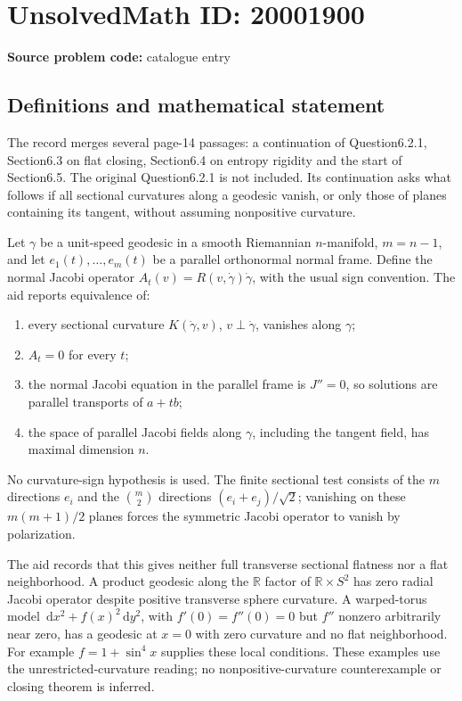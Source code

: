 \documentclass[11pt]{article}
\newcommand{\R}{\mathbb{R}}
\newcommand{\dd}{\,\mathrm{d}}
\begin{document}
\section*{UnsolvedMath ID: 20001900}
\textbf{Source problem code:} catalogue entry
\subsection{Definitions and mathematical statement}
The record merges several page-14 passages: a continuation of Question6.2.1, Section6.3 on flat closing, Section6.4 on entropy rigidity and the start of Section6.5. The original Question6.2.1 is not included. Its continuation asks what follows if all sectional curvatures along a geodesic vanish, or only those of planes containing its tangent, without assuming nonpositive curvature.

Let \(\gamma\) be a unit-speed geodesic in a smooth Riemannian \(n\)-manifold, \(m=n-1\), and let \(e_1(t),\ldots,e_m(t)\) be a parallel orthonormal normal frame. Define the normal Jacobi operator \(A_t(v)=R(v,\dot\gamma)\dot\gamma\), with the usual sign convention. The aid reports equivalence of:
\begin{enumerate}
\item every sectional curvature \(K(\dot\gamma,v)\), \(v\perp\dot\gamma\), vanishes along \(\gamma\);
\item \(A_t=0\) for every \(t\);
\item the normal Jacobi equation in the parallel frame is \(J''=0\), so solutions are parallel transports of \(a+tb\);
\item the space of parallel Jacobi fields along \(\gamma\), including the tangent field, has maximal dimension \(n\).
\end{enumerate}
No curvature-sign hypothesis is used. The finite sectional test consists of the \(m\) directions \(e_i\) and the \(\binom m2\) directions \((e_i+e_j)/\sqrt2\); vanishing on these \(m(m+1)/2\) planes forces the symmetric Jacobi operator to vanish by polarization.

The aid records that this gives neither full transverse sectional flatness nor a flat neighborhood. A product geodesic along the \(\R\) factor of \(\R\times S^2\) has zero radial Jacobi operator despite positive transverse sphere curvature. A warped-torus model \(\dd x^2+f(x)^2\dd y^2\), with \(f'(0)=f''(0)=0\) but \(f''\) nonzero arbitrarily near zero, has a geodesic at \(x=0\) with zero curvature and no flat neighborhood. For example \(f=1+\sin^4x\) supplies these local conditions. These examples use the unrestricted-curvature reading; no nonpositive-curvature counterexample or closing theorem is inferred.
\end{document}
